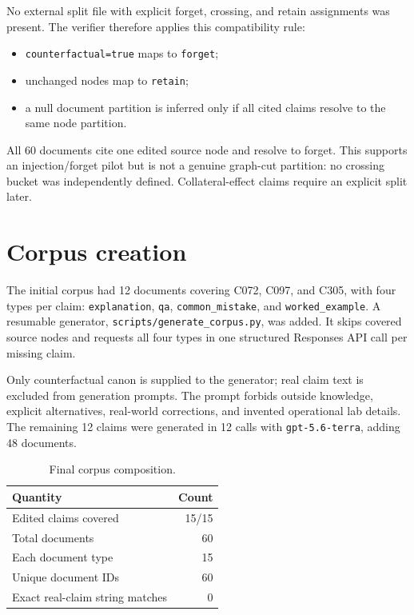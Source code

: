 \documentclass[11pt]{article}
\begin{document}
No external split file with explicit forget, crossing, and retain assignments
was present. The verifier therefore applies this compatibility rule:
\begin{itemize}[nosep]
  \item \texttt{counterfactual=true} maps to \texttt{forget};
  \item unchanged nodes map to \texttt{retain};
  \item a null document partition is inferred only if all cited claims resolve
        to the same node partition.
\end{itemize}
All 60 documents cite one edited source node and resolve to forget. This supports
an injection/forget pilot but is not a genuine graph-cut partition: no crossing
bucket was independently defined. Collateral-effect claims require an explicit
split later.

\section{Corpus creation}

The initial corpus had 12 documents covering C072, C097, and C305, with four
types per claim: \texttt{explanation}, \texttt{qa},
\texttt{common\_mistake}, and \texttt{worked\_example}. A resumable generator,
\texttt{scripts/generate\_corpus.py}, was added. It skips covered source nodes
and requests all four types in one structured Responses API call per missing
claim.

Only counterfactual canon is supplied to the generator; real claim text is
excluded from generation prompts. The prompt forbids outside knowledge,
explicit alternatives, real-world corrections, and invented operational lab
details. The remaining 12 claims were generated in 12 calls with
\texttt{gpt-5.6-terra}, adding 48 documents.

\begin{table}[h]
\centering
\begin{tabular}{lr}
\toprule
Quantity & Count \\
\midrule
Edited claims covered & 15/15 \\
Total documents & 60 \\
Each document type & 15 \\
Unique document IDs & 60 \\
Exact real-claim string matches & 0 \\
\bottomrule
\end{tabular}
\caption{Final corpus composition.}
\end{table}
\end{document}
